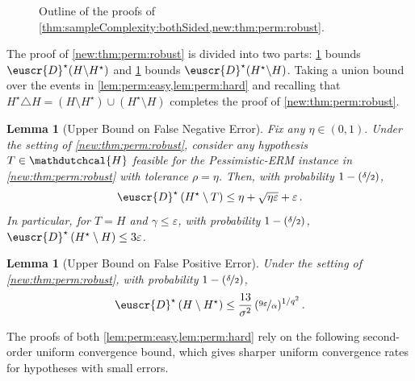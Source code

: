 \documentclass[11pt]{article}
\theoremstyle{plain}
\newtheorem{lemma}[theorem]{Lemma}
\theoremstyle{definition}
\theoremstyle{remark}
\newcommand{\inparen}[1]{\left(#1\right)}
\newcommand{\nfrac}[2]{\nicefrac{#1}{#2}}
\newcommand{\eps}{\varepsilon}
\newcommand{\customcal}[1]{\euscr{#1}}
\newcommand{\cD}{\customcal{D}}
\newcommand{\eg}{\textit{e.g.}}
\newcommand{\hypo}[1]{\mathdutchcal{#1}}
\newcommand{\hyH}{\hypo{H}}
\newcommand{\pERM}{Pessimistic-ERM}
\newcommand{\optset}{{H^\star}}
\newcommand{\cDtrue}{\cD^\star}
\begin{document}
\begin{figure}[h]
        \caption{Outline of the proofs of \cref{thm:sampleComplexity:bothSided,new:thm:perm:robust}.}
        \label{fig:outline:sampleComplexity}
    \end{figure}
    
    \noindent The proof of \cref{new:thm:perm:robust} is divided into two parts: \cref{lem:perm:easy} bounds $\cDtrue(H \backslash H^\star)$ and \cref{lem:perm:hard} bounds $\cDtrue(H^\star \backslash H)$.
        Taking a union bound over the events in \cref{lem:perm:easy,lem:perm:hard} and recalling that $\optset\triangle H=\inparen{H\setminus \optset}\cup \inparen{\optset\setminus H}$ completes the proof of \cref{new:thm:perm:robust}.
        \begin{lemma}[Upper Bound on False Negative Error]\label{lem:perm:easy} 
            Fix any $\eta\in (0,1).$
            Under the setting of \cref{new:thm:perm:robust}, consider any hypothesis $T\in \hyH$ feasible for the \pERM{} instance in \cref{new:thm:perm:robust} with tolerance $\rho=\eta$.
            Then, with probability $1-\inparen{\nfrac{\delta}{2}}$,
            \[
                \cDtrue\inparen{\optset\setminus T} \leq \eta+\sqrt{\eta\eps}+\eps\,.
            \]
            In particular, for $T=H$ and $\gamma\leq \eps$, with probability $1-\inparen{\nfrac{\delta}{2}}$, $\cDtrue\inparen{\optset \setminus H}\leq 3\eps$.
        \end{lemma}
        \begin{lemma}[Upper Bound on False Positive Error]\label{lem:perm:hard} 
            Under the setting of \cref{new:thm:perm:robust}, with probability $1-\inparen{\nfrac{\delta}{2}}$,  
            \[
                \cDtrue\inparen{H\setminus\optset} \leq 
                \frac{13}{\sigma^2} \, (\nfrac{9\eps}{\alpha})^{1/q^2}\,.
            \]
        \end{lemma}
        The proofs of both \cref{lem:perm:easy,lem:perm:hard} rely on the following second-order uniform convergence bound, which gives sharper uniform convergence rates for hypotheses with small errors.
\end{document}
